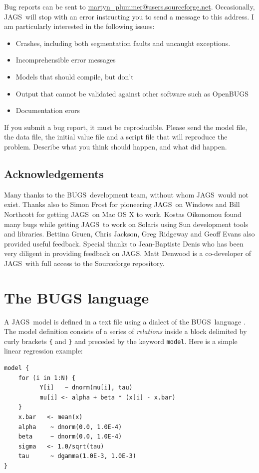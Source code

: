 \documentclass[11pt, a4paper, titlepage]{report}
\newcommand{\JAGS}{\textsf{JAGS}}
\newcommand{\BUGS}{\textsf{BUGS}}
\newcommand{\OpenBUGS}{\textsf{OpenBUGS}}
\begin{document}
Bug reports can be sent to \url{martyn_plummer@users.sourceforge.net}.
Occasionally, \JAGS\ will stop with an error instructing you to send a
message to this address. I am particularly interested in the following
issues:
\begin{itemize}
\item Crashes, including both segmentation faults and uncaught exceptions.
\item Incomprehensible error messages
\item Models that should compile, but don't 
\item Output that cannot be validated against other software such as
  \OpenBUGS
\item Documentation erors
\end{itemize}

If you submit a bug report, it must be reproducible. Please send the
model file, the data file, the initial value file and a script file
that will reproduce the problem. Describe what you think should
happen, and what did happen.

\section{Acknowledgements}

Many thanks to the \BUGS\ development team, without whom \JAGS\ would
not exist.  Thanks also to Simon Frost for pioneering \JAGS\ on
Windows and Bill Northcott for getting \JAGS\ on Mac OS X to
work. Kostas Oikonomou found many bugs while getting \JAGS\ to work on
Solaris using Sun development tools and libraries.  Bettina Gruen,
Chris Jackson, Greg Ridgeway and Geoff Evans also provided useful
feedback.  Special thanks to Jean-Baptiste Denis who has been very
diligent in providing feedback on JAGS. Matt Denwood is a co-developer
of \JAGS\ with full access to the Sourceforge repository.

\chapter{The BUGS language}
\label{chapter:bugslang}

A \JAGS\ model is defined in a text file using a dialect of the
\BUGS\ language \citep{LunnEtal2012}.  The model definition consists
of a series of {\em relations} inside a block delimited by curly brackets
\verb+{+ and \verb+}+ and preceded by the keyword \verb+model+. Here
is a simple linear regression example:

\begin{verbatim}
model {
    for (i in 1:N) {
          Y[i]   ~ dnorm(mu[i], tau)
          mu[i] <- alpha + beta * (x[i] - x.bar)
    }
    x.bar   <- mean(x)
    alpha    ~ dnorm(0.0, 1.0E-4)
    beta     ~ dnorm(0.0, 1.0E-4)
    sigma   <- 1.0/sqrt(tau)
    tau      ~ dgamma(1.0E-3, 1.0E-3)
}
\end{verbatim}
\end{document}
